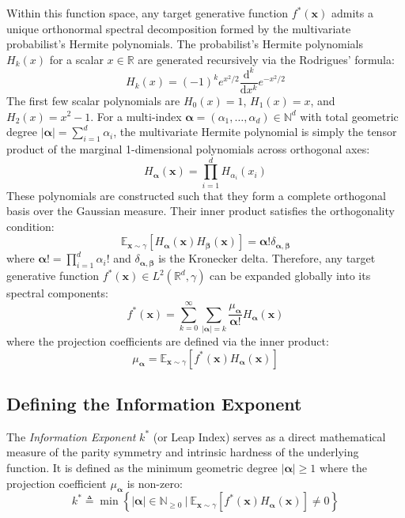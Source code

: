 \documentclass{article}
\newcommand{\E}{\mathbb{E}}
\newcommand{\R}{\mathbb{R}}
\newcommand{\N}{\mathbb{N}}
\newcommand{\1}{\mathbb{I}}
\newcommand{\diff}{\mathrm{d}}
\newcommand{\bx}{\mathbf{x}}
\newcommand{\balpha}{\boldsymbol{\alpha}}
\begin{document}
Within this function space, any target generative function $f^*(\bx)$ admits a unique orthonormal spectral decomposition formed by the multivariate probabilist's Hermite polynomials. The probabilist's Hermite polynomials $H_k(x)$ for a scalar $x \in \R$ are generated recursively via the Rodrigues' formula:
\begin{equation}
    H_k(x) = (-1)^k e^{x^2/2} \frac{\diff^k}{\diff x^k} e^{-x^2/2}
\end{equation}
The first few scalar polynomials are $H_0(x) = 1$, $H_1(x) = x$, and $H_2(x) = x^2 - 1$. For a multi-index $\balpha = (\alpha_1, \dots, \alpha_d) \in \N^d$ with total geometric degree $|\balpha| = \sum_{i=1}^d \alpha_i$, the multivariate Hermite polynomial is simply the tensor product of the marginal 1-dimensional polynomials across orthogonal axes:
\begin{equation}
    H_{\balpha}(\bx) = \prod_{i=1}^d H_{\alpha_i}(x_i)
\end{equation}
These polynomials are constructed such that they form a complete orthogonal basis over the Gaussian measure. Their inner product satisfies the orthogonality condition:
\begin{equation}
    \E_{\bx \sim \gamma}[H_{\balpha}(\bx) H_{\boldsymbol{\beta}}(\bx)] = \balpha! \delta_{\balpha, \boldsymbol{\beta}}
\end{equation}
where $\balpha! = \prod_{i=1}^d \alpha_i!$ and $\delta_{\balpha, \boldsymbol{\beta}}$ is the Kronecker delta. Therefore, any target generative function $f^*(\bx) \in L^2(\R^d, \gamma)$ can be expanded globally into its spectral components:
\begin{equation}
    f^*(\bx) = \sum_{k=0}^{\infty} \sum_{|\balpha|=k} \frac{\mu_{\balpha}}{\balpha!} H_{\balpha}(\bx)
\end{equation}
where the projection coefficients are defined via the inner product:
\begin{equation}
    \mu_{\balpha} = \E_{\bx \sim \gamma}[f^*(\bx) H_{\balpha}(\bx)]
\end{equation}

\subsection{Defining the Information Exponent}
The \textit{Information Exponent} $k^*$ (or Leap Index) serves as a direct mathematical measure of the parity symmetry and intrinsic hardness of the underlying function. It is defined as the minimum geometric degree $|\balpha| \ge 1$ where the projection coefficient $\mu_{\balpha}$ is non-zero:
\begin{equation}
    k^* \triangleq \min \left\{ |\balpha| \in \N_{\ge 0} \ \Big| \ \E_{\bx \sim \gamma}[f^*(\bx) H_{\balpha}(\bx)] \neq 0 \right\}
\end{equation}
\end{document}

